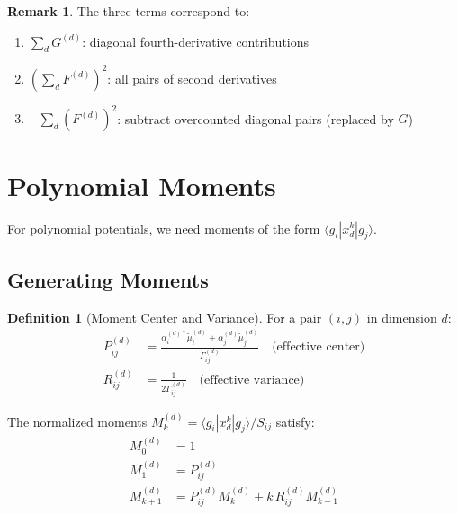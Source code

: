 \documentclass[11pt,a4paper]{article}
\theoremstyle{definition}
\newtheorem{definition}{Definition}
\newtheorem{remark}{Remark}
\begin{document}
\begin{remark}
The three terms correspond to:
\begin{enumerate}
    \item $\sum_d G^{(d)}$: diagonal fourth-derivative contributions
    \item $(\sum_d F^{(d)})^2$: all pairs of second derivatives
    \item $-\sum_d (F^{(d)})^2$: subtract overcounted diagonal pairs (replaced by $G$)
\end{enumerate}
\end{remark}

\section{Polynomial Moments}

For polynomial potentials, we need moments of the form $\langle g_i | x_d^k | g_j \rangle$.

\subsection{Generating Moments}

\begin{definition}[Moment Center and Variance]
For a pair $(i,j)$ in dimension $d$:
\begin{align}
P_{ij}^{(d)} &= \frac{\alpha_i^{(d)*} \tilde{\mu}_i^{(d)} + \alpha_j^{(d)} \tilde{\mu}_j^{(d)}}{\Gamma_{ij}^{(d)}} \quad \text{(effective center)} \\[0.3em]
R_{ij}^{(d)} &= \frac{1}{2\Gamma_{ij}^{(d)}} \quad \text{(effective variance)}
\end{align}
\end{definition}

\begin{tcolorbox}[colback=yellow!5,colframe=yellow!50!black,title=Moment Recurrence]
The normalized moments $M_k^{(d)} = \langle g_i | x_d^k | g_j \rangle / S_{ij}$ satisfy:
\begin{align}
M_0^{(d)} &= 1 \\
M_1^{(d)} &= P_{ij}^{(d)} \\
M_{k+1}^{(d)} &= P_{ij}^{(d)} M_k^{(d)} + k \, R_{ij}^{(d)} M_{k-1}^{(d)}
\end{align}
\end{tcolorbox}
\end{document}

